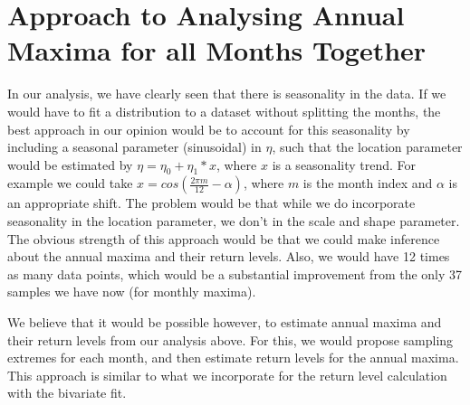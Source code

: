 \documentclass[10pt,conference,compsocconf]{IEEEtran}
\begin{document}
\section*{Approach to Analysing Annual Maxima for all Months Together}
In our analysis, we have clearly seen that there is seasonality in the data. If we would have to fit a distribution to a dataset without splitting the months, the best approach in our opinion would be to account for this seasonality by including a seasonal parameter (sinusoidal) in $\eta$, such that the location parameter would be estimated by $\eta = \eta_0 + \eta_1*x$, where $x$ is a seasonality trend. For example we could take $x=cos(\frac{2\pi m}{12}-\alpha)$, where $m$ is the month index and $\alpha$ is an appropriate shift. The problem would be that while we do incorporate seasonality in the location parameter, we don't in the scale and shape parameter. The obvious strength of this approach would be that we could make inference about the annual maxima and their return levels. Also, we would have 12 times as many data points, which would be a substantial improvement from the only 37 samples we have now (for monthly maxima).
\par
We believe that it would be possible however, to estimate annual maxima and their return levels from our analysis above. For this, we would propose sampling extremes for each month, and then estimate return levels for the annual maxima. This approach is similar to what we incorporate for the return level calculation with the bivariate fit.
\end{document}
